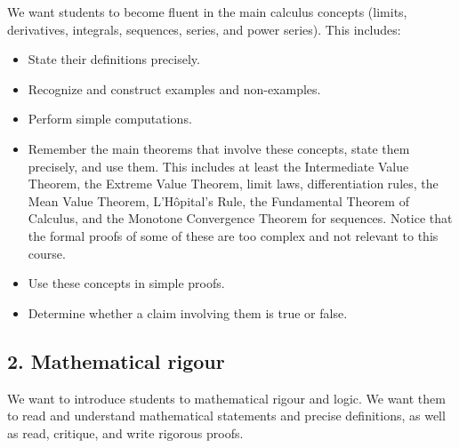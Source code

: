 \documentclass[11pt]{article}
\begin{document}
	We want students to become fluent in the main calculus concepts (limits, derivatives,
	integrals, sequences, series, and power series). This includes:
	\begin{itemize}
		\item State their definitions precisely.

		\item Recognize and construct examples and non-examples.

		\item Perform simple computations.

		\item Remember the main theorems that involve these concepts, state them
			precisely, and use them. This includes at least the Intermediate Value
			Theorem, the Extreme Value Theorem, limit laws, differentiation rules, the
			Mean Value Theorem, L'H\^{o}pital's Rule, the Fundamental Theorem of Calculus,
			and the Monotone Convergence Theorem for sequences. Notice that the formal
			proofs of some of these are too complex and not relevant to this course.

		\item Use these concepts in simple proofs.

		\item Determine whether a claim involving them is true or false.
	\end{itemize}

	\subsection{2. Mathematical rigour}

	We want to introduce students to mathematical rigour and logic. We want them to
	read and understand mathematical statements and precise definitions, as well
	as read, critique, and write rigorous proofs.
\end{document}
